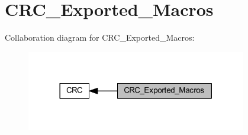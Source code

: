 \hypertarget{group___c_r_c___exported___macros}{}\section{C\+R\+C\+\_\+\+Exported\+\_\+\+Macros}
\label{group___c_r_c___exported___macros}
Collaboration diagram for C\+R\+C\+\_\+\+Exported\+\_\+\+Macros\+:
\nopagebreak
\begin{figure}[H]
\begin{center}
\leavevmode
\includegraphics[width=272pt]{group___c_r_c___exported___macros}
\end{center}
\end{figure}

